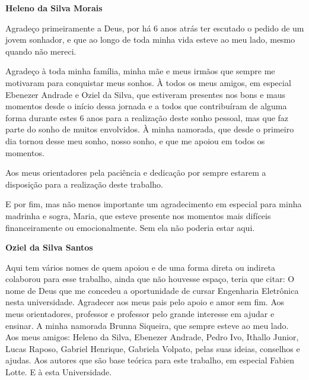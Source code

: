 \begin{agradecimentos}
   \textbf{Heleno da Silva Morais}
	\vspace*{\fill}
	\begin{flushleft}
	Agradeço primeiramente a Deus, por há 6 anos atrás ter escutado o pedido de um jovem sonhador, e que ao longo de toda minha vida esteve ao meu lado, mesmo quando não mereci.
	
	Agradeço à toda minha família, minha mãe e meus irmãos que sempre me motivaram para conquistar meus sonhos. À todos os meus amigos, em especial Ebenezer Andrade e Oziel da Silva, que estiveram presentes nos bons e maus momentos desde o início dessa jornada e a todos que contribuíram de alguma forma durante estes 6 anos para a realização deste sonho pessoal, mas que faz parte do sonho de muitos envolvidos. À minha namorada, que desde o primeiro dia tornou desse meu sonho, nosso sonho, e que me apoiou em todos os momentos.
	
	Aos meus orientadores pela paciência e dedicação por sempre estarem a disposição para a realização deste trabalho.
	
	E por fim, mas não menos importante um agradecimento em especial para minha madrinha e sogra, Maria, que esteve presente nos momentos mais difíceis financeiramente ou emocionalmente. Sem ela não poderia estar aqui.
\end{flushleft}
\vspace*{\fill}

\pagebreak

\textbf{Oziel da Silva Santos}

\vspace*{\fill}
\begin{flushleft}

Aqui tem vários nomes de quem apoiou e de uma forma direta ou indireta colaborou para esse trabalho, ainda que não houvesse espaço,
teria que citar:
O nome de Deus que me concedeu a oportunidade de cursar Engenharia Eletrônica nesta universidade. 
Agradecer aos meus pais pelo apoio e amor sem fim.
Aos meus orientadores, professor  e professor pelo grande interesse em ajudar e ensinar.
A minha namorada Brunna Siqueira, que sempre esteve ao meu lado.
Aos meus amigos: Heleno da Silva, Ebenezer Andrade, Pedro Ivo, Ithallo Junior, Lucas Raposo, Gabriel Henrique,
Gabriela Volpato, pelas suas ideias, conselhos e ajudas.
Aos autores que são base teórica para este trabalho, em especial Fabien Lotte.
E à esta Universidade.

\end{flushleft}
\vspace*{\fill}
\end{agradecimentos}
